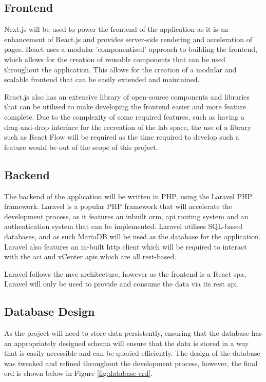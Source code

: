\subsection{Frontend}
\label{design:web-application:frontend}
Next.js will be
used to power the frontend of the application as it is an enhancement of
React.js and provides server-side rendering and acceleration of pages. React
uses a modular 'componentised' approach to building the frontend, which allows
for the creation of reusable components that can be used throughout the
application. This allows for the creation of a modular and scalable frontend
that can be easily extended and maintained.

React.js also has an extensive
library of open-source components and libraries that can be utilised to make
developing the frontend easier and more feature complete. Due to the complexity
of some required features, such as having a drag-and-drop interface for the
recreation of the lab space, the use of a library such as React Flow will be
required as the time required to develop such a feature would be out of the
scope of this project.

\subsection{Backend}
\label{design:web-application:backend}
The backend of the application will be
written in PHP, using the Laravel PHP framework. Laravel is a popular PHP
framework that will accelerate the development process, as it features an
inbuilt \gls{orm}, \gls{api} routing system and an authentication system that
can be implemented. Laravel utilises SQL-based databases, and as such MariaDB
will be used as the database for the application. Laravel also features an
in-built \gls{http} client which will be required to interact with the
\gls{aci} and vCenter \gls{api}s which are all \gls{rest}-based.

Laravel
follows the \gls{mvc} architecture, however as the frontend is a React
\gls{spa}, Laravel will only be used to provide and consume the data via its
\gls{rest} \gls{api}.

\subsection{Database Design}
\label{design:web-application:database}
As the project will need to store data
persistently, ensuring that the database has an appropriately designed schema
will ensure that the data is stored in a way that is easily accessible and can
be queried efficiently. The design of the database was tweaked and refined
throughout the development process, however, the final \gls{erd} is shown below
in Figure \ref{fig:database-erd}.

